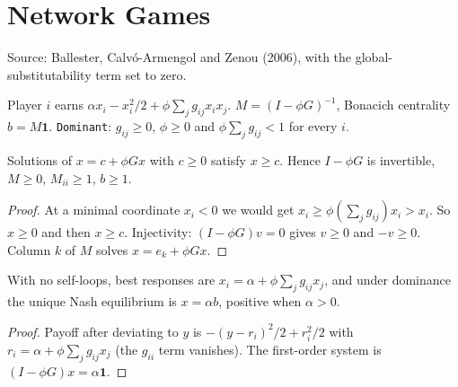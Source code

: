 \chapter{Network Games}
\label{chap:networks}

Source: Ballester, Calv\'o-Armengol and Zenou (2006), with the global-substitutability term set to zero.

\begin{definition}
\label{def:net-game}
\leanok
Player $i$ earns $\alpha x_i-x_i^2/2+\phi\sum_jg_{ij}x_ix_j$. $M=(I-\phi G)^{-1}$, Bonacich centrality $b=M\mathbf 1$.
\texttt{Dominant}: $g_{ij}\ge0$, $\phi\ge0$ and $\phi\sum_jg_{ij}<1$ for every $i$.
\end{definition}

\begin{lemma}
\label{lem:net-dominant}
\leanok
{}
Solutions of $x=c+\phi Gx$ with $c\ge0$ satisfy $x\ge c$. Hence $I-\phi G$ is invertible, $M\ge0$, $M_{ii}\ge1$, $b\ge1$.
\end{lemma}
\begin{proof}
\leanok
At a minimal coordinate $x_{i}<0$ we would get $x_{i}\ge\phi(\sum_jg_{ij})x_{i}>x_{i}$. So $x\ge0$ and then $x\ge c$.
Injectivity: $(I-\phi G)v=0$ gives $v\ge0$ and $-v\ge0$. Column $k$ of $M$ solves $x=e_k+\phi Gx$.
\end{proof}

\begin{theorem}
\label{thm:net-nash}
\leanok
{}
With no self-loops, best responses are $x_i=\alpha+\phi\sum_jg_{ij}x_j$, and under dominance the unique Nash
equilibrium is $x=\alpha b$, positive when $\alpha>0$.
\end{theorem}
\begin{proof}
\leanok
Payoff after deviating to $y$ is $-(y-r_i)^2/2+r_i^2/2$ with $r_i=\alpha+\phi\sum_jg_{ij}x_j$ (the $g_{ii}$ term vanishes).
The first-order system is $(I-\phi G)x=\alpha\mathbf 1$.
\end{proof}


